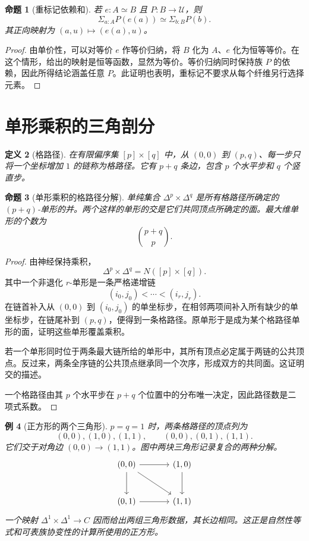 \documentclass[12pt,oneside,openany,fontset=none]{ctexbook}
\theoremstyle{cn}
\newtheorem{definition}{定义}[chapter]
\newtheorem{example}[definition]{例}
\newtheorem{proposition}[definition]{命题}
\numberwithin{equation}{chapter}
\newcommand{\U}{\mathcal U}
\begin{document}
\begin{proposition}[重标记依赖和]
若 $e:A\simeq B$ 且 $P:B\to\U$，则
\[
 \Sigma_{a:A}P(e(a))\simeq\Sigma_{b:B}P(b).
\]
其正向映射为 $(a,u)\mapsto(e(a),u)$。
\end{proposition}
\begin{proof}
由单价性，可以对等价 $e$ 作等价归纳，将 $B$ 化为 $A$、$e$ 化为恒等等价。在这个情形，给出的映射是恒等函数，显然为等价。等价归纳同时保持族 $P$ 的依赖，因此所得结论涵盖任意 $P$。此证明也表明，重标记不要求从每个纤维另行选择元素。
\end{proof}

\section{单形乘积的三角剖分}

\begin{definition}[格路径]
在有限偏序集 $[p]\times[q]$ 中，从 $(0,0)$ 到 $(p,q)$、每一步只将一个坐标增加 $1$ 的链称为格路径。它有 $p+q$ 条边，包含 $p$ 个水平步和 $q$ 个竖直步。
\end{definition}

\begin{proposition}[单形乘积的格路径分解]
单纯集合 $\Delta^p\times\Delta^q$ 是所有格路径所确定的 $(p+q)$-单形的并。两个这样的单形的交是它们共同顶点所确定的面。最大维单形的个数为
\[
 \binom{p+q}{p}.
\]
\end{proposition}
\begin{proof}
由神经保持乘积，
\[
 \Delta^p\times\Delta^q=N([p]\times[q]).
\]
其中一个非退化 $r$-单形是一条严格递增链
\[
 (i_0,j_0)<\cdots<(i_r,j_r).
\]
在链首补入从 $(0,0)$ 到 $(i_0,j_0)$ 的单坐标步，在相邻两项间补入所有缺少的单坐标步，在链尾补到 $(p,q)$，便得到一条格路径。原单形于是成为某个格路径单形的面，证明这些单形覆盖乘积。

若一个单形同时位于两条最大链所给的单形中，其所有顶点必定属于两链的公共顶点。反过来，两条全序链的公共顶点继承同一个次序，形成双方的共同面。这证明交的描述。

一个格路径由其 $p$ 个水平步在 $p+q$ 个位置中的分布唯一决定，因此路径数是二项式系数。
\end{proof}

\begin{example}[正方形的两个三角形]
$p=q=1$ 时，两条格路径的顶点列为
\[
 (0,0),(1,0),(1,1),
 \qquad
 (0,0),(0,1),(1,1).
\]
它们交于对角边 $(0,0)\to(1,1)$。图中两块三角形记录复合的两种分解。
\[
\begin{tikzcd}[row sep=large,column sep=large]
 (0,0)\arrow[r]\arrow[d]\arrow[dr]&(1,0)\arrow[d]\\
 (0,1)\arrow[r]&(1,1)
\end{tikzcd}
\]
一个映射 $\Delta^1\times\Delta^1\to C$ 因而给出两组三角形数据，其长边相同。这正是自然性等式和可表族协变性的计算所使用的正方形。
\end{example}
\end{document}
